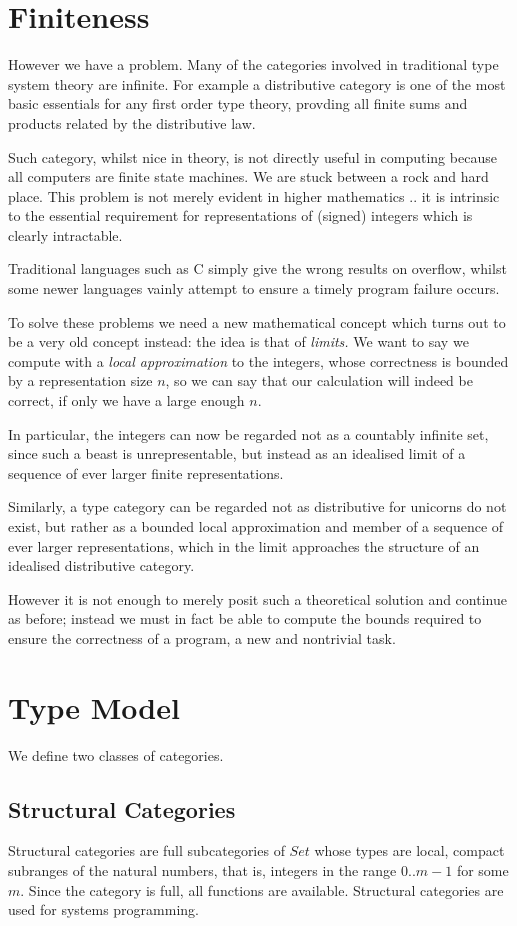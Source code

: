 \documentclass[oneside]{book}
\theoremstyle{plain}
\theoremstyle{definition}
\theoremstyle{plain}
\def\Set{\mathit{Set}}
\begin{document}
\section{Finiteness}
However we have a problem. Many of the categories involved in traditional
type system theory are infinite. For example a distributive category is
one of the most basic essentials for any first order type theory,
provding all finite sums and products related by the distributive law.

Such category, whilst nice in theory, is not directly useful in 
computing because all computers are finite state machines. We are stuck 
between a rock and hard place. This problem is not merely evident in
higher mathematics .. it is intrinsic to the essential requirement for representations
of (signed) integers which is clearly intractable.

Traditional languages such as C simply give the wrong results on overflow,
whilst some newer languages vainly attempt to ensure a timely program
failure occurs.


To solve these problems we need a new mathematical concept which turns out
to be a very old concept instead: the idea is that of {\em limits.}
We want to say we compute with a {\em local approximation} to the integers,
whose correctness is bounded by a representation size $n$, so we can say
that our calculation will indeed be correct, if only we have a large enough $n$.

In particular, the integers can now be regarded not as a countably infinite set,
since such a beast is unrepresentable, but instead as an idealised limit
of a sequence of ever larger finite representations.

Similarly, a type category can be regarded not as distributive for unicorns
do not exist, but rather as a bounded local approximation and member of
a sequence of ever larger representations, which in the limit approaches
the structure of an idealised distributive category.

However it is not enough to merely posit such a theoretical solution
and continue as before; instead we must in fact be able to compute
the bounds required to ensure the correctness of a program, a new
and nontrivial task.

\section{Type Model}
We define two classes of categories.

\subsection{Structural Categories}
Structural categories are full subcategories of $\Set$ whose
types are local, compact subranges of the natural numbers,
that is, integers in the range $0..m-1$ for some $m$.
Since the category is full, all functions are available.
Structural categories are used for systems programming.
\end{document}
